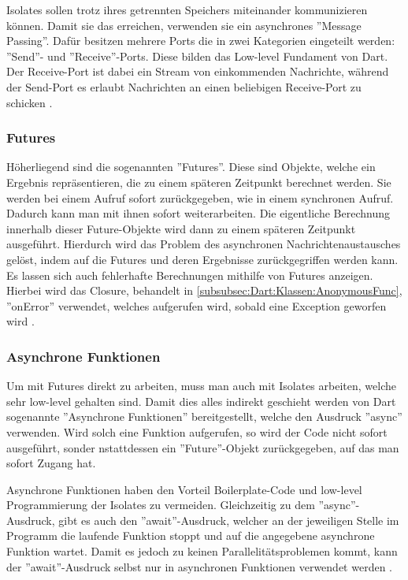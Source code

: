     \noindent
    Isolates sollen trotz ihres getrennten Speichers miteinander kommunizieren können. Damit sie das erreichen, verwenden sie ein asynchrones ''Message Passing''.
    Dafür besitzen mehrere Ports die in zwei Kategorien eingeteilt werden: ''Send''- und ''Receive''-Ports.
    Diese bilden das Low-level Fundament von Dart.
    Der Receive-Port ist dabei ein Stream von einkommenden Nachrichte, während der Send-Port es erlaubt Nachrichten an einen beliebigen Receive-Port zu schicken \cite{book:Dart:DPL_GiladBracha}.

    \subsubsection{Futures}
    \label{subsubsec:Dart:Concurrency:Futures}
    Höherliegend sind die sogenannten ''Futures''. Diese sind Objekte, welche ein Ergebnis repräsentieren, die zu einem späteren Zeitpunkt berechnet werden.
    Sie werden bei einem Aufruf sofort zurückgegeben, wie in einem synchronen Aufruf. Dadurch kann man mit ihnen sofort weiterarbeiten.
    Die eigentliche Berechnung innerhalb dieser Future-Objekte wird dann zu einem späteren Zeitpunkt ausgeführt.
    Hierdurch wird das Problem des asynchronen Nachrichtenaustausches gelöst, indem auf die Futures und deren Ergebnisse zurückgegriffen werden kann.
    Es lassen sich auch fehlerhafte Berechnungen mithilfe von Futures anzeigen. Hierbei wird das Closure, behandelt in \ref{subsubsec:Dart:Klassen:AnonymousFunc}, ''onError'' verwendet, welches aufgerufen wird, sobald eine Exception geworfen wird \cite{book:Dart:DPL_GiladBracha}.
    
    \subsubsection{Asynchrone Funktionen}
    \label{subsubsec:Dart:Concurrency:AsyncFunc}
    Um mit Futures direkt zu arbeiten, muss man auch mit Isolates arbeiten, welche sehr low-level gehalten sind.
    Damit dies alles indirekt geschieht werden von Dart sogenannte ''Asynchrone Funktionen'' bereitgestellt, welche den Ausdruck ''async'' verwenden.
    Wird solch eine Funktion aufgerufen, so wird der Code nicht sofort ausgeführt, sonder nstattdessen ein ''Future''-Objekt zurückgegeben, auf das man sofort Zugang hat.

    \noindent
    Asynchrone Funktionen haben den Vorteil Boilerplate-Code und low-level Programmierung der Isolates zu vermeiden.
    Gleichzeitig zu dem ''async''-Ausdruck, gibt es auch den ''await''-Ausdruck, welcher an der jeweiligen Stelle im Programm die laufende Funktion stoppt und auf die angegebene asynchrone Funktion wartet.
    Damit es jedoch zu keinen Parallelitätsproblemen kommt, kann der ''await''-Ausdruck selbst nur in asynchronen Funktionen verwendet werden \cite{book:Dart:DPL_GiladBracha}.
    
